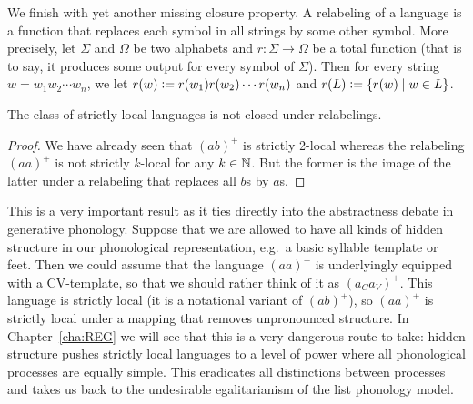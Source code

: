 We finish with yet another missing closure property.
A relabeling of a language is a function that replaces each symbol in all strings by some other symbol.
More precisely, let $\Sigma$ and $\Omega$ be two alphabets and $r: \Sigma \rightarrow \Omega$ be a total function (that is to say, it produces some output for every symbol of $\Sigma$).
Then for every string $w = w_1 w_2 \cdots w_n$, we let $r(w) \mathrel{\mathop:}= r(w_1) r(w_2) \cdots r(w_n)$ and $r(L) \mathrel{\mathop:}= \left \{  r(w) \mid w \in L \right \}$.
%
\begin{lemma}
    The class of strictly local languages is not closed under relabelings.
\end{lemma}
%
\begin{proof}
    We have already seen that $(ab)^+$ is strictly 2-local whereas the relabeling $(aa)^+$ is not strictly $k$-local for any $k \in \mathbb{N}$.
    But the former is the image of the latter under a relabeling that replaces all $b$s by $a$s.
\end{proof}
%
This is a very important result as it ties directly into the abstractness debate in generative phonology.
Suppose that we are allowed to have all kinds of hidden structure in our phonological representation, e.g.\ a basic syllable template or feet.
Then we could assume that the language $(aa)^+$ is underlyingly equipped with a CV-template, so that we should rather think of it as $(a_C a_V)^+$.
This language is strictly local (it is a notational variant of $(ab)^+$), so $(aa)^+$ is strictly local under a mapping that removes unpronounced structure.
In Chapter~\ref{cha:REG} we will see that this is a very dangerous route to take: hidden structure pushes strictly local languages to a level of power where all phonological processes are equally simple.
This eradicates all distinctions between processes and takes us back to the undesirable egalitarianism of the list phonology model.

